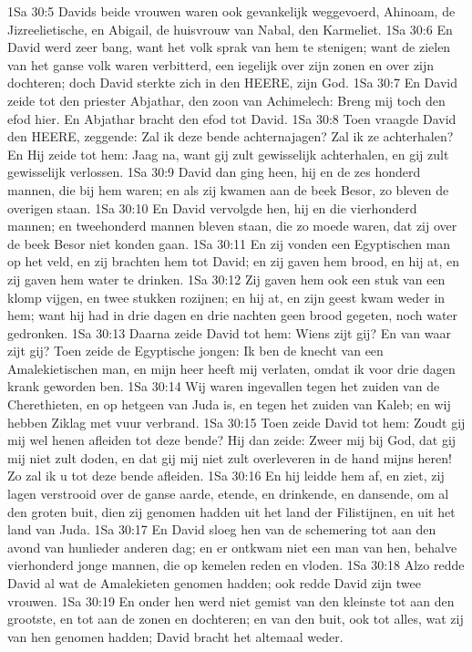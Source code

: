 1Sa 30:5  Davids beide vrouwen waren ook gevankelijk weggevoerd, Ahinoam, de Jizreelietische, en Abigail, de huisvrouw van Nabal, den Karmeliet.
1Sa 30:6  En David werd zeer bang, want het volk sprak van hem te stenigen; want de zielen van het ganse volk waren verbitterd, een iegelijk over zijn zonen en over zijn dochteren; doch David sterkte zich in den HEERE, zijn God.
1Sa 30:7  En David zeide tot den priester Abjathar, den zoon van Achimelech: Breng mij toch den efod hier. En Abjathar bracht den efod tot David.
1Sa 30:8  Toen vraagde David den HEERE, zeggende: Zal ik deze bende achternajagen? Zal ik ze achterhalen? En Hij zeide tot hem: Jaag na, want gij zult gewisselijk achterhalen, en gij zult gewisselijk verlossen.
1Sa 30:9  David dan ging heen, hij en de zes honderd mannen, die bij hem waren; en als zij kwamen aan de beek Besor, zo bleven de overigen staan.
1Sa 30:10  En David vervolgde hen, hij en die vierhonderd mannen; en tweehonderd mannen bleven staan, die zo moede waren, dat zij over de beek Besor niet konden gaan.
1Sa 30:11  En zij vonden een Egyptischen man op het veld, en zij brachten hem tot David; en zij gaven hem brood, en hij at, en zij gaven hem water te drinken.
1Sa 30:12  Zij gaven hem ook een stuk van een klomp vijgen, en twee stukken rozijnen; en hij at, en zijn geest kwam weder in hem; want hij had in drie dagen en drie nachten geen brood gegeten, noch water gedronken.
1Sa 30:13  Daarna zeide David tot hem: Wiens zijt gij? En van waar zijt gij? Toen zeide de Egyptische jongen: Ik ben de knecht van een Amalekietischen man, en mijn heer heeft mij verlaten, omdat ik voor drie dagen krank geworden ben.
1Sa 30:14  Wij waren ingevallen tegen het zuiden van de Cherethieten, en op hetgeen van Juda is, en tegen het zuiden van Kaleb; en wij hebben Ziklag met vuur verbrand.
1Sa 30:15  Toen zeide David tot hem: Zoudt gij mij wel henen afleiden tot deze bende? Hij dan zeide: Zweer mij bij God, dat gij mij niet zult doden, en dat gij mij niet zult overleveren in de hand mijns heren! Zo zal ik u tot deze bende afleiden.
1Sa 30:16  En hij leidde hem af, en ziet, zij lagen verstrooid over de ganse aarde, etende, en drinkende, en dansende, om al den groten buit, dien zij genomen hadden uit het land der Filistijnen, en uit het land van Juda.
1Sa 30:17  En David sloeg hen van de schemering tot aan den avond van hunlieder anderen dag; en er ontkwam niet een man van hen, behalve vierhonderd jonge mannen, die op kemelen reden en vloden.
1Sa 30:18  Alzo redde David al wat de Amalekieten genomen hadden; ook redde David zijn twee vrouwen.
1Sa 30:19  En onder hen werd niet gemist van den kleinste tot aan den grootste, en tot aan de zonen en dochteren; en van den buit, ook tot alles, wat zij van hen genomen hadden; David bracht het altemaal weder.
